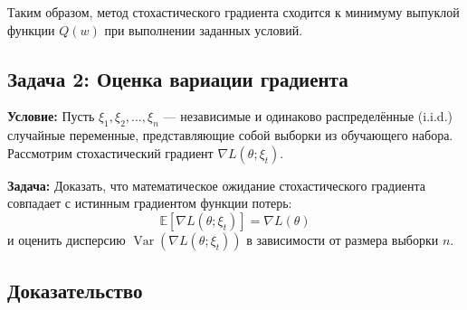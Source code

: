 Таким образом, метод стохастического градиента сходится к минимуму выпуклой функции \( Q(w) \) при выполнении заданных условий.

\subsection*{Задача 2: Оценка вариации градиента}

\textbf{Условие:} Пусть \( \xi_1, \xi_2, \ldots, \xi_n \) — независимые и одинаково распределённые (i.i.d.) случайные переменные, представляющие собой выборки из обучающего набора. Рассмотрим стохастический градиент \( \nabla L(\theta; \xi_t) \).

\textbf{Задача:} Доказать, что математическое ожидание стохастического градиента совпадает с истинным градиентом функции потерь:
\[
\mathbb{E}[\nabla L(\theta; \xi_t)] = \nabla L(\theta)
\]
и оценить дисперсию \( \operatorname{Var}(\nabla L(\theta; \xi_t)) \) в зависимости от размера выборки \( n \).

\subsection*{Доказательство}

